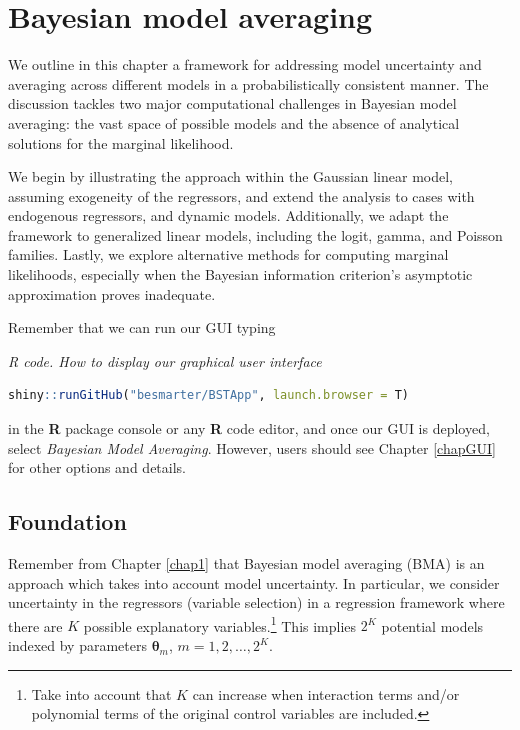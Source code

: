 \chapter{Bayesian model averaging}\label{chap10}

We outline in this chapter a framework for addressing model uncertainty and averaging across different models in a probabilistically consistent manner. The discussion tackles two major computational challenges in Bayesian model averaging: the vast space of possible models and the absence of analytical solutions for the marginal likelihood.

We begin by illustrating the approach within the Gaussian linear model, assuming exogeneity of the regressors, and extend the analysis to cases with endogenous regressors, and dynamic models. Additionally, we adapt the framework to generalized linear models, including the logit, gamma, and Poisson families. Lastly, we explore alternative methods for computing marginal likelihoods, especially when the Bayesian information criterion's asymptotic approximation proves inadequate.  

Remember that we can run our GUI typing

\begin{tcolorbox}[enhanced,width=4.67in,center upper,
	fontupper=\large\bfseries,drop shadow southwest,sharp corners]
	\textit{R code. How to display our graphical user interface}
	\begin{VF}
		\begin{lstlisting}[language=R]
	shiny::runGitHub("besmarter/BSTApp", launch.browser = T)\end{lstlisting}
	\end{VF}
\end{tcolorbox} 

in the \textbf{R} package console or any \textbf{R} code editor, and once our GUI is deployed, select \textit{Bayesian Model Averaging}. However, users should see Chapter \ref{chapGUI} for other options and details.

\section{Foundation}\label{sec10_1}
Remember from Chapter \ref{chap1} that Bayesian model averaging (BMA) is an approach which takes into account model uncertainty. In particular, we consider uncertainty in the regressors (variable selection) in a regression framework where there are $K$ possible explanatory variables.\footnote{Take into account that $K$ can increase when interaction terms and/or polynomial terms of the original control variables are included.} This implies $2^K$ potential models indexed by parameters $\bm{\theta}_m$, $m=1,2,\dots,2^K$.

